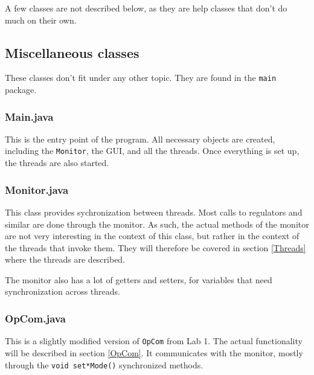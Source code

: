 A few classes are not described below, as they are help classes that don't do much on their own. %






\subsection{Miscellaneous classes} 	%
These classes don't fit under any other topic. They are found in the \texttt{main} package.

\subsubsection{Main.java}
This is the entry point of the program. All necessary objects are created, including the \texttt{Monitor}, the GUI, and all the threads. Once everything is set up, the threads are also started. 

\subsubsection{Monitor.java}
This class provides sychronization between threads. Most calls to regulators and similar are done through the monitor. As such, the actual methods of the monitor are not very interesting in the context of this class, but rather in the context of the threads that invoke them. They will therefore be covered in section \ref{Threads} where the threads are described.

The monitor also has a lot of getters and setters, for variables that need synchronization across threads.

\subsubsection{OpCom.java}
This is a slightly modified version of \texttt{OpCom} from Lab 1. The actual functionality will be described in section \ref{OpCom}. It communicates with the monitor, mostly through the \texttt{void set*Mode()} synchronized methods.



